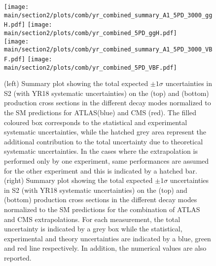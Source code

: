 \begin{figure}[hbtp]
\centering
\texttt{[image: \\main/section2/plots/comb/yr\_combined\_summary\_A1\_5PD\_3000\_ggH.pdf]}%
\texttt{[image: \\main/section2/plots/comb/yr\_combined\_5PD\_ggH.pdf]}\\
\texttt{[image: \\main/section2/plots/comb/yr\_combined\_summary\_A1\_5PD\_3000\_VBF.pdf]}%
\texttt{[image: \\main/section2/plots/comb/yr\_combined\_5PD\_VBF.pdf]}%
\caption{(left) Summary plot showing the total expected $\pm 1\sigma$ uncertainties in S2 (with YR18 systematic uncertainties) on the \ggh (top) and \vbf (bottom) production cross sections in the different decay modes normalized to the SM predictions   for ATLAS(blue)  and CMS (red). The filled coloured box corresponds to the statistical and experimental systematic uncertainties, while the hatched grey area represent the additional contribution to the total uncertainty due to theoretical systematic uncertainties. In the cases where  the extrapolation is performed only by one experiment, same performances are assumed for the other experiment and this is indicated by a  hatched bar.
(right) Summary plot showing the total expected $\pm 1\sigma$  uncertainties in S2 (with YR18 systematic uncertainties) on the \ggh (top) and \vbf (bottom) production cross sections in the different decay modes normalized to the SM predictions for the combination of ATLAS and CMS extrapolations. For each measurement,  the total uncertainty is indicated by a grey box while the statistical, experimental and theory uncertainties are indicated by a blue, green and red line respectively. In addition, the numerical values are also reported.}
\label{fig:summary_A1_5PD_ggH_VBF}
\end{figure}


